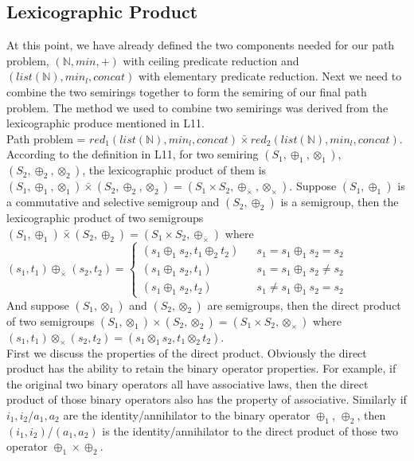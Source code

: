 \documentclass[a4paper,10pt]{article}
\begin{document}
\subsection{Lexicographic Product}
At this point, we have already defined the two components needed for our path problem, $(\mathbb{N},min,+)$ with ceiling predicate reduction and $(list(\mathbb{N}),min_l,concat)$ with elementary predicate reduction. Next we need to combine the two semirings together to form the semiring of our final path problem. The method we used to combine two semirings was derived from the lexicographic produce mentioned in L11.\\ Path problem = $red_1 (list(\mathbb{N}),min_l,concat) \bar{\times} red_2 (list(\mathbb{N}),min_l,concat)$.\\
According to the definition in L11, for two semiring $(S_1,\oplus_1,\otimes_1)$,$(S_2,\oplus_2,\otimes_2)$, the lexicographic product of them is $(S_1,\oplus_1,\otimes_1) \bar{\times} (S_2,\oplus_2,\otimes_2) = (S_1\times S_2, \oplus_{\bar{\times}}, \otimes_\times)$.
Suppose $(S_1,\oplus_1)$ is a commutative and selective semigroup and $(S_2,\oplus_2)$ is a semigroup, then the lexicographic product of two semigroups $(S_1,\oplus_1) \bar{\times} (S_2,\oplus_2) = (S_1\times S_2, \oplus_{\bar{\times}})$ where\\
$(s_1,t_1) \oplus_{\bar{\times}} (s_2,t_2)=\left\{
\begin{array}{rcl}
(s_1\oplus_1 s_2,t_1\oplus_2 t_2)      &      & { s_1 = s_1 \oplus_1 s_2 = s_2}\\
(s_1\oplus_1 s_2,t_1)       &      & {s_1 = s_1 \oplus_1 s_2 \neq s_2}\\
(s_1\oplus_1 s_2,t_2)       &      & {s_1 \neq s_1 \oplus_1 s_2 = s_2}
\end{array} \right.$\\
And suppose $(S_1,\otimes_1)$ and $(S_2,\otimes_2)$ are semigroups, then the direct product of two semigroups $(S_1,\otimes_1) \times (S_2,\otimes_2) = (S_1\times S_2, \otimes_\times)$ where\\
$(s_1,t_1) \otimes_\times (s_2,t_2)= (s_1 \otimes_1 s_2, t_1\otimes_2 t_2)$.\\
First we discuss the properties of the direct product. Obviously the direct product has the ability to retain the binary operator properties. For example, if the original two binary operators all have associative laws, then the direct product of those binary operators also has the property of associative. Similarly if $i_1,i_2$/$a_1,a_2$ are the identity/annihilator to the binary operator $\oplus_1$, $\oplus_2$, then $(i_1,i_2)$/$(a_1,a_2)$ is the identity/annihilator to the direct product of those two operator $\oplus_1 \times \oplus_2$.\\
\end{document}
